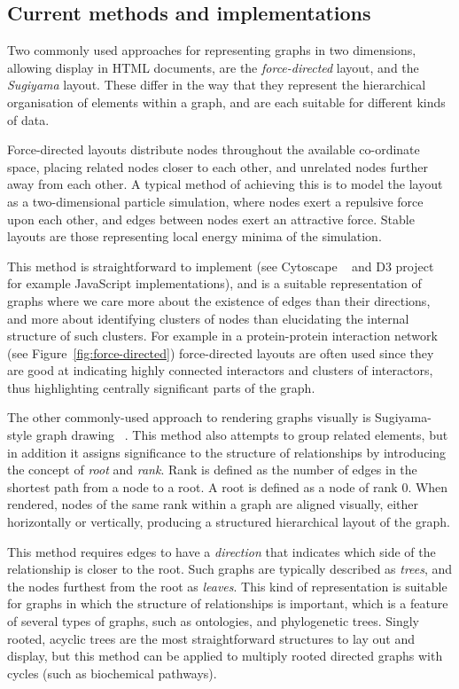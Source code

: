 \documentclass[10pt,a4paper,twocolumn]{article}
\begin{document}
\subsection*{Current methods and implementations}

Two commonly used approaches for representing graphs in two dimensions, allowing
display in HTML documents, are the \emph{force-directed} layout, and the
\emph{Sugiyama} layout. These differ in the way that they represent the
hierarchical organisation of elements within a graph, and are each suitable for
different kinds of data.

Force-directed layouts distribute nodes throughout the available co-ordinate
space, placing related nodes closer to each other, and unrelated nodes further
away from each other. A typical method of achieving this is to model the layout
as a two-dimensional particle simulation, where nodes exert a repulsive force
upon each other, and edges between nodes exert an attractive force. Stable
layouts are those representing local energy minima of the simulation. 

This method is straightforward to implement (see Cytoscape ~\cite{cytoscape} and
D3 project ~\cite{d3} for example JavaScript implementations), and is a suitable
representation of graphs where we care more about the existence of edges than
their directions, and more about identifying clusters of nodes than elucidating
the internal structure of such clusters. For example in a protein-protein
interaction network (see Figure~\ref{fig:force-directed}) force-directed layouts
are often used since they are good at indicating highly connected interactors
and clusters of interactors, thus highlighting centrally significant parts of
the graph. 

The other commonly-used approach to rendering graphs visually is Sugiyama-style
graph drawing ~\cite{sugiyama}. This method also attempts to group related
elements, but in addition it assigns significance to the structure of
relationships by introducing the concept of \emph{root} and \emph{rank}. Rank is
defined as the number of edges in the shortest path from a node to a root. A
root is defined as a node of rank 0. When rendered, nodes of the same rank
within a graph are aligned visually, either horizontally or vertically,
producing a structured hierarchical layout of the graph.

This method requires edges to have a \emph{direction} that indicates which side
of the relationship is closer to the root. Such graphs are typically described
as \emph{trees}, and the nodes furthest from the root as \emph{leaves}.  This
kind of representation is suitable for graphs in which the structure of
relationships is important, which is a feature of several types of graphs, such
as ontologies, and phylogenetic trees. Singly rooted, acyclic trees are the most
straightforward structures to lay out and display, but this method can be
applied to multiply rooted directed graphs with cycles (such as biochemical
pathways). 
\end{document}

